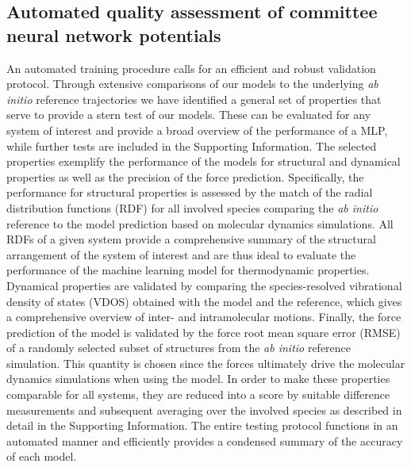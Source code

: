\documentclass[aip,jcp,amsmath,amssymb,floatfix,reprint,citeautoscript,noeprint]{revtex4-1}
\begin{document}
\begin{bibunit}
%
%
%
%
\section*{Automated quality assessment of committee neural network potentials}
\label{sec:res} 
%

%
An automated training procedure calls for an efficient and robust validation protocol. 
%
Through extensive comparisons of our models to the underlying 
\textit{ab initio} reference trajectories we have identified a general set
of properties that serve to provide a stern test of our models.
%
These can be evaluated for any system of interest and provide a broad overview of the performance of a MLP, while further tests are included in the Supporting Information.
%
The selected properties exemplify the
performance of the models for structural and dynamical
properties as well as the precision of the force prediction.
%
Specifically, the performance for structural properties is assessed
by the match of the radial distribution functions (RDF)
for all involved species comparing the \textit{ab initio}
reference to the model prediction based on molecular dynamics
simulations.
%
All RDFs of a given system provide a comprehensive
summary of the structural arrangement of the
system of interest and are thus ideal to evaluate
the performance of the machine learning model
for thermodynamic properties.
%
Dynamical properties are validated by comparing the
species-resolved vibrational density of states (VDOS)
obtained with the model and the reference,
which gives a comprehensive overview of inter-
and intramolecular motions.
%
Finally, the force prediction of the model is validated by the
force root mean square error (RMSE) of a randomly selected
subset of structures from the \textit{ab initio}
reference simulation.
%
This quantity is chosen since the forces ultimately
drive the molecular dynamics simulations when using the model.
%
In order to make these properties comparable for
all systems, they are reduced into a score
by suitable difference measurements and subsequent
averaging over the involved species
as described in detail in the Supporting Information.
%
The entire testing protocol functions in an automated manner and efficiently provides a condensed summary of the accuracy of each model. 



\end{bibunit}
\end{document}
